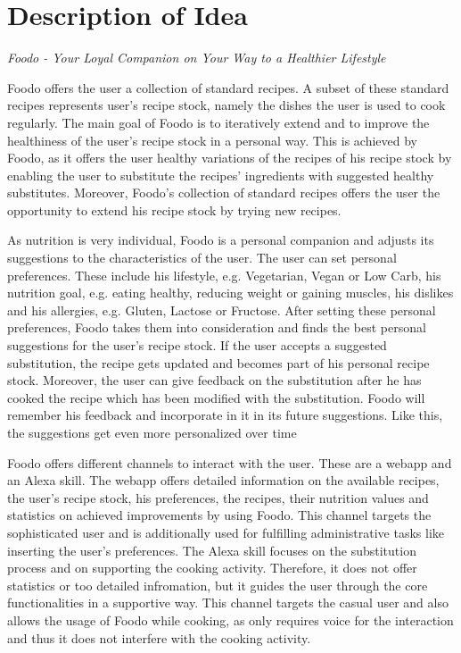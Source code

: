 \chapter{Description of Idea}
\begin{center}
\textit{Foodo - Your Loyal Companion on Your Way to a Healthier Lifestyle}
\end{center}

Foodo offers the user a collection of standard recipes. A subset of these standard recipes represents user's recipe stock, namely the dishes the user is used to cook regularly. The main goal of Foodo is to iteratively extend and to improve the healthiness of the user's recipe stock in a personal way. This is achieved by Foodo, as it offers the user healthy variations of the recipes of his recipe stock by enabling the user to substitute the recipes' ingredients with suggested healthy substitutes. Moreover, Foodo's collection of standard recipes offers the user the opportunity to extend his recipe stock by trying new recipes. 

As nutrition is very individual, Foodo is a personal companion and adjusts its suggestions to the characteristics of the user. The user can set personal preferences. These include his lifestyle, e.g. Vegetarian, Vegan or Low Carb, his nutrition goal, e.g. eating healthy, reducing weight or gaining muscles, his dislikes and his allergies, e.g. Gluten, Lactose or Fructose. After setting these personal preferences, Foodo takes them into consideration and finds the best personal suggestions for the user's recipe stock. If the user accepts a suggested substitution, the recipe gets updated and becomes part of his personal recipe stock. Moreover, the user can give feedback on the substitution after he has cooked the recipe which has been modified with the substitution. Foodo will remember his feedback and incorporate in it in its future suggestions. Like this, the suggestions get even more personalized over time

Foodo offers different channels to interact with the user. These are a webapp and an Alexa skill. The webapp offers detailed information on the available recipes, the user's recipe stock, his preferences, the recipes, their nutrition values and statistics on achieved improvements by using Foodo. This channel targets the sophisticated user and is additionally used for fulfilling administrative tasks like inserting the user's preferences. The Alexa skill focuses on the substitution process and on supporting the cooking activity. Therefore, it does not offer statistics or too detailed infromation, but it guides the user through the core functionalities in a supportive way. This channel targets the casual user and also allows the usage of Foodo while cooking, as only requires voice for the interaction and thus it does not interfere with the cooking activity.


